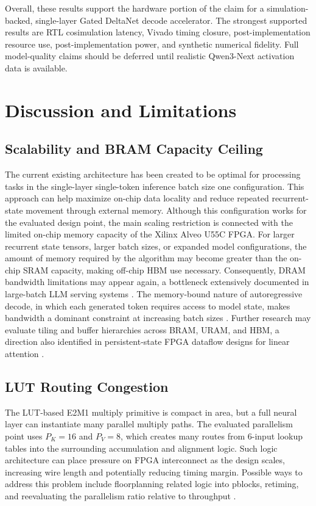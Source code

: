 ﻿\documentclass[conference]{IEEEtran}
\newcommand{\PaperRoot}{}
\renewcommand{\PaperRoot}{paper/}%
\renewcommand{\PaperRoot}{}%
\newcommand{\PaperInput}[1]{}
\begin{document}
\begin{table}[t]
\centering
\caption{Recurrent-state storage and off-chip traffic accounting for MXFP4 $B=32$.}
\label{tab:state_traffic_results}
\scriptsize
\resizebox{\linewidth}{!}{\PaperInput{tables/state_storage_traffic.tex}}
\end{table}

Overall, these results support the hardware portion of the claim for a simulation-backed, single-layer Gated DeltaNet decode accelerator. The strongest supported results are RTL cosimulation latency, Vivado timing closure, post-implementation resource use, post-implementation power, and synthetic numerical fidelity. Full model-quality claims should be deferred until realistic Qwen3-Next activation data is available.

\section{Discussion and Limitations}

\subsection{Scalability and BRAM Capacity Ceiling}
The current existing architecture has been created to be optimal for processing tasks in the single-layer single-token inference batch size one configuration. This approach can help maximize on-chip data locality and reduce repeated recurrent-state movement through external memory. Although this configuration works for the evaluated design point, the main scaling restriction is connected with the limited on-chip memory capacity of the Xilinx Alveo U55C FPGA. For larger recurrent state tensors, larger batch sizes, or expanded model configurations, the amount of memory required by the algorithm may become greater than the on-chip SRAM capacity, making off-chip HBM use necessary. Consequently, DRAM bandwidth limitations may appear again, a bottleneck extensively documented in large-batch LLM serving systems \cite{b1,b4,b7}. The memory-bound nature of autoregressive decode, in which each generated token requires access to model state, makes bandwidth a dominant constraint at increasing batch sizes \cite{b5}. Further research may evaluate tiling and buffer hierarchies across BRAM, URAM, and HBM, a direction also identified in persistent-state FPGA dataflow designs for linear attention \cite{b10}.

\subsection{LUT Routing Congestion}
The LUT-based E2M1 multiply primitive is compact in area, but a full neural layer can instantiate many parallel multiply paths. The evaluated parallelism point uses $P_K=16$ and $P_V=8$, which creates many routes from 6-input lookup tables into the surrounding accumulation and alignment logic. Such logic architecture can place pressure on FPGA interconnect as the design scales, increasing wire length and potentially reducing timing margin. Possible ways to address this problem include floorplanning related logic into pblocks, retiming, and reevaluating the parallelism ratio relative to throughput \cite{b10}.
\end{document}
